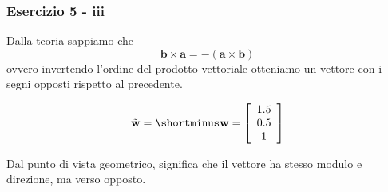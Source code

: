 \documentclass{beamer}
\begin{document}
\begin{frame}
\frametitle{Esercizio 5 - iii}
Dalla teoria sappiamo che
\begin{displaymath}
\mathbf{b} \times \mathbf{a} = - (\mathbf{a} \times \mathbf{b})
\end{displaymath}
ovvero invertendo l'ordine del prodotto vettoriale otteniamo un vettore con i segni opposti rispetto al precedente.

\begin{displaymath}
\tilde{\mathbf w} = 
\shortminus \mathbf w = 
    \left[ \begin{array}{c} 
        1.5 \\
        0.5 \\
        1
    \end{array} \right]
\end{displaymath}

\vspace{0.5cm}

Dal punto di vista geometrico, significa che il vettore ha stesso modulo e direzione, ma verso opposto.

\end{frame}
\end{document}
